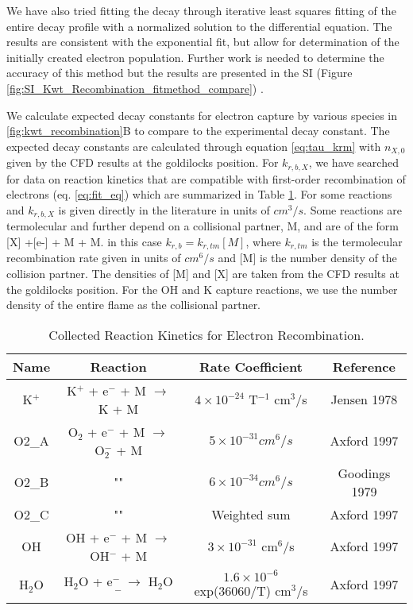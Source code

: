 We have also tried fitting the decay through iterative least squares fitting of the entire decay profile with a normalized solution to the differential equation. The results are consistent with the exponential fit, but allow for determination of the initially created electron population. Further work is needed to determine the accuracy of this method but the results are presented in the SI (Figure \ref*{fig:SI_Kwt_Recombination_fitmethod_compare}) .

We calculate expected decay constants for electron capture by various species in \ref{fig:kwt_recombination}B to compare to the experimental decay constant. The expected decay constants are calculated through equation \ref{eq:tau_krm} with $n_{X,0}$ given by the CFD results at the goldilocks position. For $k_{r,b,X}$, we have searched for data on reaction kinetics that are compatible with first-order recombination of electrons (eq. \ref{eq:fit_eq}) which are summarized in Table \ref{tab:reactions}. For some reactions and $k_{r,b,X}$ is given directly in the literature in units of $cm^3/s$. Some reactions are termolecular and further depend on a collisional partner, M, and are of the form [X] +[e-] + M \rightarrow [X-] + M. in this case $k_{r,b} = k_{r,tm} [M]$, where $k_{r,tm}$ is the termolecular recombination rate given in units of $cm^6/s$ and [M] is the number density of the collision partner.  The densities of [M] and [X] are taken from the CFD results at the goldilocks position. For the OH and K capture reactions, we use the number density of the entire flame as the collisional partner. 


\begin{table}[h]
\centering
\caption{Collected Reaction Kinetics for Electron Recombination.}
\label{tab:reactions}
\begin{tabular}{|c|c|c|c|}
\hline
Name & Reaction & Rate Coefficient & Reference \\
\hline
K$^+$ & K$^+$ + e$^-$ + M $\rightarrow$ K + M & $4 \times 10^{-24}$ T$^{-1}$ cm$^3$/s & Jensen 1978 \\
\hline
O2\_A & O$_2$ + e$^-$ + M $\rightarrow$ O$_2^-$ + M & $5 \times 10^{-31} cm^6/s$ & Axford 1997 \\
\hline
O2\_B & ""                                          & $6 \times 10^{-34} cm^6/s$ &  Goodings 1979 \\
\hline
O2\_C & ""                                          & Weighted sum  &  Axford 1997 \\
\hline
OH & OH + e$^-$ + M $\rightarrow$ OH$^-$ + M & $3 \times 10^{-31}$ cm$^6$/s & Axford 1997 \\
\hline
H$_2$O & H$_2$O + e$^-$ $\rightarrow$ H$_2$O$^-$ & $1.6 \times 10^{-6}$ exp(36060/T) cm$^3$/s & Axford 1997 \\
\hline
\end{tabular}
\end{table}

